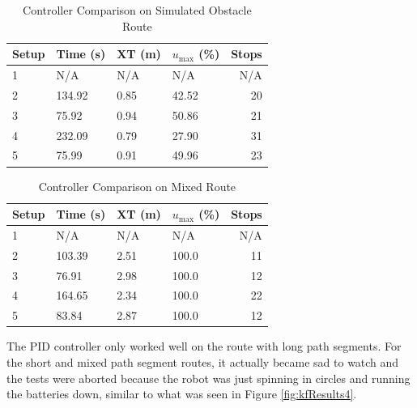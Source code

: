 \begin{table}[ht!]
\caption{Controller Comparison on Simulated Obstacle Route}
\small
\centering
\begin{tabular}{@{}llllr@{}} \toprule
Setup & Time (s) & XT (m) & $u_{\text{max}}$ (\%) & Stops \\ \midrule
1     & N/A      & N/A    & N/A                   & N/A   \\
2     & 134.92   & 0.85   & 42.52                 & 20    \\
3     & 75.92    & 0.94   & 50.86                 & 21    \\
4     & 232.09   & 0.79   & 27.90                 & 31    \\
5     & 75.99    & 0.91   & 49.96                 & 23    \\ \bottomrule
\end{tabular}
\label{tab:resultsControllersObstacles}
\end{table}

\begin{table}[ht!]
\caption{Controller Comparison on Mixed Route}
\small
\centering
\begin{tabular}{@{}llllr@{}} \toprule
Setup & Time (s) & XT (m) & $u_{\text{max}}$ (\%) & Stops \\ \midrule
1     & N/A      & N/A    & N/A                   & N/A   \\
2     & 103.39   & 2.51   & 100.0                 & 11    \\
3     & 76.91    & 2.98   & 100.0                 & 12    \\
4     & 164.65   & 2.34   & 100.0                 & 22    \\
5     & 83.84    & 2.87   & 100.0                 & 12    \\ \bottomrule
\end{tabular}
\label{tab:resultsControllersMixed}
\end{table}

The PID controller only worked well on the route with long path segments. For the short and mixed path segment routes, it actually became sad to watch and the tests were aborted because the robot was just spinning in circles and running the batteries down, similar to what was seen in Figure \ref{fig:kfResults4}.

